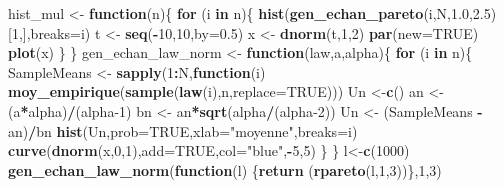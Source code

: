 \documentclass[]{article}
\newenvironment{Shaded}{\begin{snugshade}}{\end{snugshade}}
\newcommand{\ControlFlowTok}[1]{\textcolor[rgb]{0.13,0.29,0.53}{\textbf{#1}}}
\newcommand{\DataTypeTok}[1]{\textcolor[rgb]{0.13,0.29,0.53}{#1}}
\newcommand{\DecValTok}[1]{\textcolor[rgb]{0.00,0.00,0.81}{#1}}
\newcommand{\FloatTok}[1]{\textcolor[rgb]{0.00,0.00,0.81}{#1}}
\newcommand{\KeywordTok}[1]{\textcolor[rgb]{0.13,0.29,0.53}{\textbf{#1}}}
\newcommand{\NormalTok}[1]{#1}
\newcommand{\OperatorTok}[1]{\textcolor[rgb]{0.81,0.36,0.00}{\textbf{#1}}}
\newcommand{\OtherTok}[1]{\textcolor[rgb]{0.56,0.35,0.01}{#1}}
\newcommand{\StringTok}[1]{\textcolor[rgb]{0.31,0.60,0.02}{#1}}
\begin{document}
\begin{Shaded}
\begin{Highlighting}[]
\NormalTok{hist_mul <-}\StringTok{ }\ControlFlowTok{function}\NormalTok{(n)\{}
  \ControlFlowTok{for}\NormalTok{ (i }\ControlFlowTok{in}\NormalTok{ n)\{}
    \KeywordTok{hist}\NormalTok{(}\KeywordTok{gen_echan_pareto}\NormalTok{(i,N,}\FloatTok{1.0}\NormalTok{,}\FloatTok{2.5}\NormalTok{)[}\DecValTok{1}\NormalTok{,],}\DataTypeTok{breaks=}\NormalTok{i)}
\NormalTok{    t <-}\StringTok{ }\KeywordTok{seq}\NormalTok{(}\OperatorTok{-}\DecValTok{10}\NormalTok{,}\DecValTok{10}\NormalTok{,}\DataTypeTok{by=}\FloatTok{0.5}\NormalTok{)}
\NormalTok{x <-}\StringTok{ }\KeywordTok{dnorm}\NormalTok{(t,}\DecValTok{1}\NormalTok{,}\DecValTok{2}\NormalTok{)}
\KeywordTok{par}\NormalTok{(}\DataTypeTok{new=}\OtherTok{TRUE}\NormalTok{)}
\KeywordTok{plot}\NormalTok{(x)}
\NormalTok{  \}}
\NormalTok{\}}
\NormalTok{gen_echan_law_norm <-}\StringTok{ }\ControlFlowTok{function}\NormalTok{(law,a,alpha)\{}
  \ControlFlowTok{for}\NormalTok{ (i }\ControlFlowTok{in}\NormalTok{ n)\{}
\NormalTok{    SampleMeans <-}\StringTok{ }\KeywordTok{sapply}\NormalTok{(}\DecValTok{1}\OperatorTok{:}\NormalTok{N,}\ControlFlowTok{function}\NormalTok{(i) }\KeywordTok{moy_empirique}\NormalTok{(}\KeywordTok{sample}\NormalTok{(}\KeywordTok{law}\NormalTok{(i),n,}\DataTypeTok{replace=}\OtherTok{TRUE}\NormalTok{)))}
\NormalTok{    Un <-}\KeywordTok{c}\NormalTok{()}
\NormalTok{    an <-}\StringTok{ }\NormalTok{(a}\OperatorTok{*}\NormalTok{alpha)}\OperatorTok{/}\NormalTok{(alpha}\DecValTok{-1}\NormalTok{)}
\NormalTok{    bn <-}\StringTok{ }\NormalTok{an}\OperatorTok{*}\KeywordTok{sqrt}\NormalTok{(alpha}\OperatorTok{/}\NormalTok{(alpha}\DecValTok{-2}\NormalTok{))}
\NormalTok{    Un <-}\StringTok{ }\NormalTok{(SampleMeans }\OperatorTok{-}\StringTok{ }\NormalTok{an)}\OperatorTok{/}\NormalTok{bn }
    \KeywordTok{hist}\NormalTok{(Un,}\DataTypeTok{prob=}\OtherTok{TRUE}\NormalTok{,}\DataTypeTok{xlab=}\StringTok{"moyenne"}\NormalTok{,}\DataTypeTok{breaks=}\NormalTok{i)}
    \KeywordTok{curve}\NormalTok{(}\KeywordTok{dnorm}\NormalTok{(x,}\DecValTok{0}\NormalTok{,}\DecValTok{1}\NormalTok{),}\DataTypeTok{add=}\OtherTok{TRUE}\NormalTok{,}\DataTypeTok{col=}\StringTok{"blue"}\NormalTok{,}\OperatorTok{-}\DecValTok{5}\NormalTok{,}\DecValTok{5}\NormalTok{)}
\NormalTok{  \}}
\NormalTok{\}}
\NormalTok{l<-}\KeywordTok{c}\NormalTok{(}\DecValTok{1000}\NormalTok{)}
\KeywordTok{gen_echan_law_norm}\NormalTok{(}\ControlFlowTok{function}\NormalTok{(l) \{}\KeywordTok{return}\NormalTok{ (}\KeywordTok{rpareto}\NormalTok{(l,}\DecValTok{1}\NormalTok{,}\DecValTok{3}\NormalTok{))\},}\DecValTok{1}\NormalTok{,}\DecValTok{3}\NormalTok{)}
\end{Highlighting}
\end{Shaded}
\end{document}
